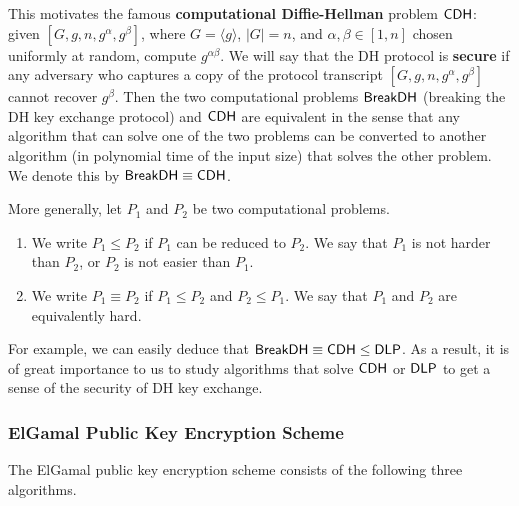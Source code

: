 This motivates the famous {\bf computational Diffie-Hellman} problem ${\sf CDH}$: given 
$[G, g, n, g^\alpha, g^\beta]$, where $G = \langle g \rangle$, $|G| = n$, 
and $\alpha, \beta \in [1, n]$ chosen uniformly at random, compute $g^{\alpha\beta}$. 
We will say that the DH protocol is {\bf secure} if any adversary who captures a 
copy of the protocol transcript $[G, g, n, g^\alpha, g^\beta]$ cannot recover 
$g^\beta$. Then the two computational problems ${\sf BreakDH}$ (breaking the DH 
key exchange protocol) and ${\sf CDH}$ are equivalent in the sense that any algorithm 
that can solve one of the two problems can be converted to another algorithm 
(in polynomial time of the input size) that solves the other problem. We denote this 
by ${\sf BreakDH} \equiv {\sf CDH}$. 

More generally, let $P_1$ and $P_2$ be two computational problems. 
\begin{enumerate}[(1)]
    \item We write $P_1 \leq P_2$ if $P_1$ can be reduced to $P_2$. We say that 
          $P_1$ is not harder than $P_2$, or $P_2$ is not easier than $P_1$. 
    \item We write $P_1 \equiv P_2$ if $P_1 \leq P_2$ and $P_2 \leq P_1$. 
          We say that $P_1$ and $P_2$ are equivalently hard. 
\end{enumerate}

For example, we can easily deduce that ${\sf BreakDH} \equiv {\sf CDH} \leq {\sf DLP}$. 
As a result, it is of great importance to us to study algorithms that solve 
${\sf CDH}$ or ${\sf DLP}$ to get a sense of the security of DH key exchange. 

\subsubsection{ElGamal Public Key Encryption Scheme}
The ElGamal public key encryption scheme consists of the following three algorithms. 

